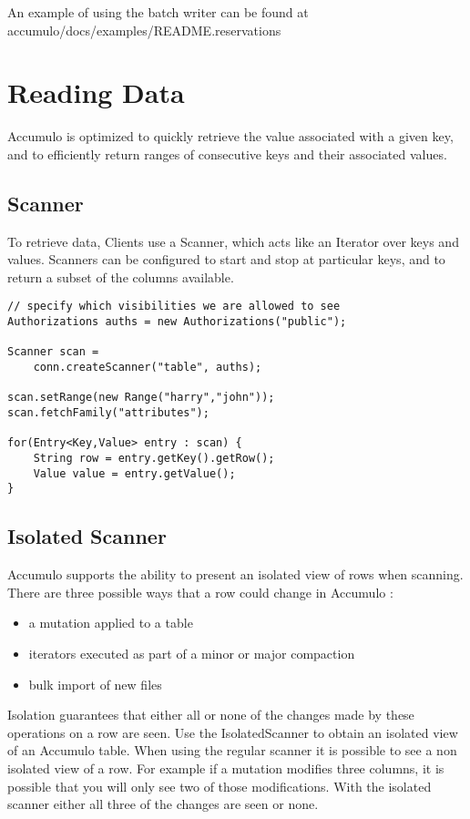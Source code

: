 An example of using the batch writer can be found at\\
accumulo/docs/examples/README.reservations

\section{Reading Data}

Accumulo is optimized to quickly retrieve the value associated with a given key, and
to efficiently return ranges of consecutive keys and their associated values.

\subsection{Scanner}

To retrieve data, Clients use a Scanner, which acts like an Iterator over
keys and values. Scanners can be configured to start and stop at particular keys, and
to return a subset of the columns available.

\small
\begin{verbatim}
// specify which visibilities we are allowed to see
Authorizations auths = new Authorizations("public");

Scanner scan =
    conn.createScanner("table", auths);

scan.setRange(new Range("harry","john"));
scan.fetchFamily("attributes");

for(Entry<Key,Value> entry : scan) {
    String row = entry.getKey().getRow();
    Value value = entry.getValue();
}
\end{verbatim}
\normalsize

\subsection{Isolated Scanner}

Accumulo supports the ability to present an isolated view of rows when
scanning. There are three possible ways that a row could change in Accumulo :

\begin{itemize}
 \item a mutation applied to a table
 \item iterators executed as part of a minor or major compaction
 \item bulk import of new files
\end{itemize}

Isolation guarantees that either all or none of the changes made by these
operations on a row are seen. Use the IsolatedScanner to obtain an isolated
view of an Accumulo table. When using the regular scanner it is possible to see
a non isolated view of a row. For example if a mutation modifies three
columns, it is possible that you will only see two of those modifications.
With the isolated scanner either all three of the changes are seen or none.

